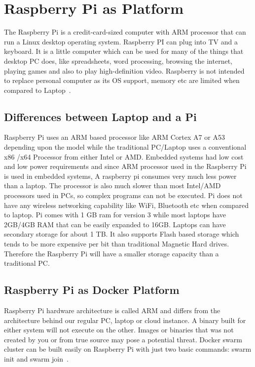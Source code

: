 \section{Raspberry Pi as Platform}

The Raspberry Pi is a credit-card-sized computer with ARM processor
that can run a Linux desktop operating system.  Raspberry PI can plug
into TV and a keyboard. It is a little computer which can be used for
many of the things that desktop PC does, like spreadsheets, word
processing, browsing the internet, playing games and also to play
high-definition video. Raspberry is not intended to replace personal
computer as its OS support, memory etc are limited when compared to
Laptop~\cite{Rpi}.
	
\subsection{Differences between Laptop and a Pi}

Raspberry Pi uses an ARM based processor like ARM Cortex A7 or A53
depending upon the model while the traditional PC/Laptop uses a
conventional x86 /x64 Processor from either Intel or AMD. Embedded
systems had low cost and low power requirements and since ARM
processor used in the Raspberry Pi is used in embedded systems, A
raspberry pi consumes very much less power than a laptop. The
processor is also much slower than most Intel/AMD processors used in
PCs, so complex programs can not be executed. Pi does not have any
wireless networking capability like WiFi, Bluetooth etc when compared
to laptop.  Pi comes with 1 GB ram for version 3 while most laptops
have 2GB/4GB RAM that can be easily expanded to 16GB. Laptops can have
secondary storage for about 1 TB. It also supports Flash based storage
which tends to be more expensive per bit than traditional Magnetic
Hard drives. Therefore the Raspberry Pi will have a smaller storage
capacity than a traditional PC.
    
\subsection{Raspberry Pi as Docker Platform}

 
Raspberry Pi hardware architecture is called ARM and differs from the
architecture behind our regular PC, laptop or cloud instance. A binary
built for either system will not execute on the other. Images or
binaries that was not created by you or from true source may pose a
potential threat.  Docker swarm cluster can be built easily on
Raspberry Pi with just two basic commands: swarm init and swarm
join~\cite{dockrpi}.


